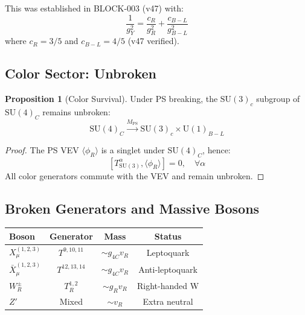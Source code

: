 \documentclass[11pt,a4paper]{article}
\theoremstyle{definition}
\newtheorem{proposition}[theorem]{Proposition}
\begin{document}
This was established in BLOCK-003 (v47) with:
\begin{equation}
  \label{eq:hypercharge-coupling}
  \frac{1}{g_Y^2} = \frac{c_R}{g_R^2} + \frac{c_{B-L}}{g_{B-L}^2}
\end{equation}
where $c_R = 3/5$ and $c_{B-L} = 4/5$ (v47 verified).

\subsection{Color Sector: Unbroken}
\label{subsec:color-unbroken}

\begin{proposition}[Color Survival]
\label{prop:color-survival}
Under PS breaking, the $\text{SU}(3)_c$ subgroup of $\text{SU}(4)_C$ remains unbroken:
\begin{equation}
  \label{eq:color-survival}
  \text{SU}(4)_C \xrightarrow{M_{\text{PS}}} \text{SU}(3)_c \times \text{U}(1)_{B-L}
\end{equation}
\end{proposition}

\begin{proof}
The PS VEV $\langle \phi_R \rangle$ is a singlet under $\text{SU}(4)_C$, hence:
\begin{equation}
  \label{eq:color-commutes}
  [T^{\alpha}_{\text{SU}(3)}, \langle \phi_R \rangle] = 0, \quad \forall \alpha
\end{equation}
All color generators commute with the VEV and remain unbroken.
\end{proof}

\subsection{Broken Generators and Massive Bosons}
\label{subsec:broken-generators}

\begin{canonbox}
\begin{center}
\begin{tabular}{lccc}
\toprule
\textbf{Boson} & \textbf{Generator} & \textbf{Mass} & \textbf{Status} \\
\midrule
$X_{\mu}^{(1,2,3)}$ & $T^{9,10,11}$ & $\sim g_{4C} v_R$ & Leptoquark \\
$\bar{X}_{\mu}^{(1,2,3)}$ & $T^{12,13,14}$ & $\sim g_{4C} v_R$ & Anti-leptoquark \\
$W_R^{\pm}$ & $T_R^{1,2}$ & $\sim g_R v_R$ & Right-handed W \\
$Z'$ & Mixed & $\sim v_R$ & Extra neutral \\
\bottomrule
\end{tabular}
\end{center}
\end{canonbox}
\end{document}
